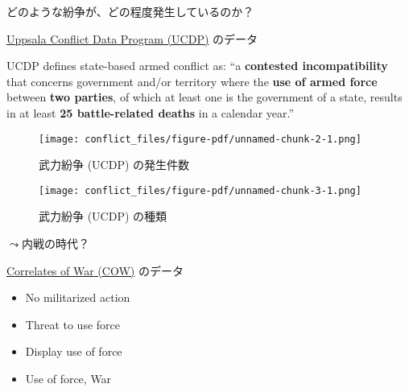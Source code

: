 \documentclass[
  xelatex,
  ja=standard]{bxjsarticle}
\providecommand{\tightlist}{%
  \setlength{\itemsep}{0pt}\setlength{\parskip}{0pt}}\usepackage{longtable,booktabs,array}
\begin{document}
どのような紛争が、どの程度発生しているのか？

\href{https://ucdp.uu.se/encyclopedia}{Uppsala Conflict Data Program
(UCDP)} のデータ\citep{gleditsch2002}

\begin{tcolorbox}[enhanced jigsaw, arc=.35mm, breakable, colbacktitle=quarto-callout-note-color!10!white, bottomrule=.15mm, opacityback=0, colframe=quarto-callout-note-color-frame, leftrule=.75mm, toptitle=1mm, opacitybacktitle=0.6, titlerule=0mm, rightrule=.15mm, left=2mm, bottomtitle=1mm, coltitle=black, title=\textcolor{quarto-callout-note-color}{\faInfo}\hspace{0.5em}{\href{https://ucdp.uu.se/downloads/ucdpprio/ucdp-prio-acd-221.pdf}{UCDPにおける武力紛争の定義}}, toprule=.15mm, colback=white]

UCDP defines state-based armed conflict as: ``a \textbf{contested
incompatibility} that concerns government and/or territory where the
\textbf{use of armed force} between \textbf{two parties}, of which at
least one is the government of a state, results in at least \textbf{25
battle-related deaths} in a calendar year.''

\end{tcolorbox}

\begin{figure}[htpb]

{\centering \texttt{[image: conflict\_files/figure-pdf/unnamed-chunk-2-1.png]}

}

\caption{武力紛争 (UCDP) の発生件数}

\end{figure}

\begin{figure}[htpb]

{\centering \texttt{[image: conflict\_files/figure-pdf/unnamed-chunk-3-1.png]}

}

\caption{武力紛争 (UCDP) の種類}

\end{figure}

\(\leadsto\)内戦の時代？

\href{https://correlatesofwar.org/data-sets/MIDs}{Correlates of War
(COW)} のデータ\citep{palmer2022}

\begin{itemize}
\tightlist
\item
  No militarized action
\item
  Threat to use force
\item
  Display use of force
\item
  Use of force, War
\end{itemize}
\end{document}
